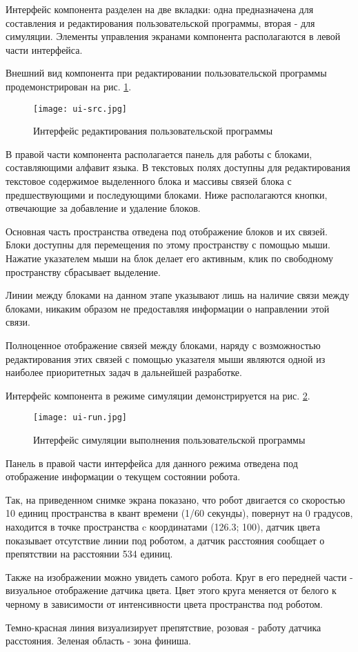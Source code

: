 Интерфейс компонента разделен на две вкладки: одна предназначена для составления и редактирования пользовательской программы, вторая - для симуляции. Элементы управления экранами компонента располагаются в левой части интерфейса.

Внешний вид компонента при редактировании пользовательской программы продемонстрирован на рис. \ref{fig:ui-src}.

\begin{figure}[htbp]
	\centering
	\texttt{[image: ui-src.jpg]}
	\caption{Интерфейс редактирования пользовательской программы}%
	\label{fig:ui-src}
\end{figure}

В правой части компонента располагается панель для работы с блоками, составляющими алфавит языка. В текстовых полях доступны для редактирования текстовое содержимое выделенного блока и массивы связей блока с предшествующими и последующими блоками. Ниже располагаются кнопки, отвечающие за добавление и удаление блоков.

Основная часть пространства отведена под отображение блоков и их связей. Блоки доступны для перемещения по этому пространству с помощью мыши. Нажатие указателем мыши на блок делает его активным, клик по свободному пространству сбрасывает выделение.

Линии между блоками на данном этапе указывают лишь на наличие связи между блоками, никаким образом не предоставляя информации о направлении этой связи. 

Полноценное отображение связей между блоками, наряду с возможностью редактирования этих связей с помощью указателя мыши являются одной из наиболее приоритетных задач в дальнейшей разработке.

Интерфейс компонента в режиме симуляции демонстрируется на рис. \ref{fig:ui-run}.

\begin{figure}[htbp]
	\centering
	\texttt{[image: ui-run.jpg]}
	\caption{Интерфейс симуляции выполнения пользовательской программы}%
	\label{fig:ui-run}
\end{figure}

Панель в правой части интерфейса для данного режима отведена под отображение информации о текущем состоянии робота.

Так, на приведенном снимке экрана показано, что робот двигается со скоростью 10 единиц пространства в квант времени (1/60 секунды), повернут на 0 градусов, находится в точке пространства c координатами (126.3; 100), датчик цвета показывает отсутствие линии под роботом, а датчик расстояния сообщает о препятствии на расстоянии 534 единиц.

Также на изображении можно увидеть самого робота. Круг в его передней части - визуальное отображение датчика цвета. Цвет этого круга меняется от белого к черному в зависимости от интенсивности цвета пространства под роботом.

Темно-красная линия визуализирует препятствие, розовая - работу датчика расстояния. Зеленая область - зона финиша.

